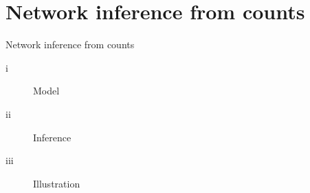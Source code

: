\documentclass[11pt]{beamer}
\newcommand{\bleu}[1]{\textcolor{Framableulight}{#1}}
\begin{document}
 
\section{Network inference from counts}
\begin{frame}{}
\begin{center}
\Huge{\bleu{Network inference from counts}}
\end{center}
\begin{center}
\begin{description}
\item[i] Model
\item[ii]  Inference
\item[iii] Illustration
\end{description}
\end{center}
\end{frame}
\end{document}
